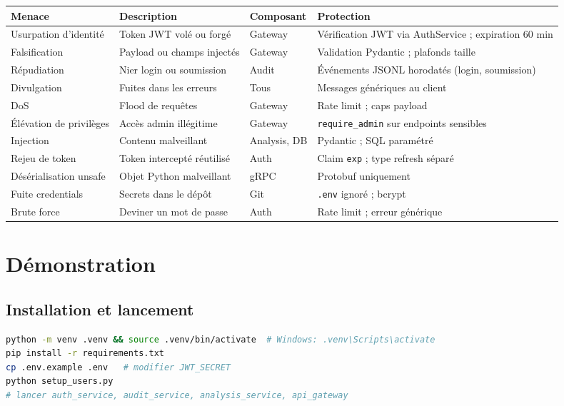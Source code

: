 \documentclass[11pt,a4paper]{article}
\begin{document}
{\small
\begin{longtable}{@{}p{2.6cm}p{3.2cm}p{2.2cm}p{5.2cm}@{}}
\toprule
Menace & Description & Composant & Protection \\
\midrule
\endhead
Usurpation d'identité & Token JWT volé ou forgé & Gateway & Vérification JWT via AuthService ; expiration 60 min \\
Falsification & Payload ou champs injectés & Gateway & Validation Pydantic ; plafonds taille \\
Répudiation & Nier login ou soumission & Audit & Événements JSONL horodatés (login, soumission) \\
Divulgation & Fuites dans les erreurs & Tous & Messages génériques au client \\
DoS & Flood de requêtes & Gateway & Rate limit ; caps payload \\
Élévation de privilèges & Accès admin illégitime & Gateway & \texttt{require\_admin} sur endpoints sensibles \\
Injection & Contenu malveillant & Analysis, DB & Pydantic ; SQL paramétré \\
Rejeu de token & Token intercepté réutilisé & Auth & Claim \texttt{exp} ; type refresh séparé \\
Désérialisation unsafe & Objet Python malveillant & gRPC & Protobuf uniquement \\
Fuite credentials & Secrets dans le dépôt & Git & \texttt{.env} ignoré ; bcrypt \\
Brute force & Deviner un mot de passe & Auth & Rate limit ; erreur générique \\
\bottomrule
\end{longtable}
}

\section{Démonstration}

\subsection{Installation et lancement}

\begin{lstlisting}[language=bash]
python -m venv .venv && source .venv/bin/activate  # Windows: .venv\Scripts\activate
pip install -r requirements.txt
cp .env.example .env   # modifier JWT_SECRET
python setup_users.py
# lancer auth_service, audit_service, analysis_service, api_gateway
\end{lstlisting}
\end{document}
